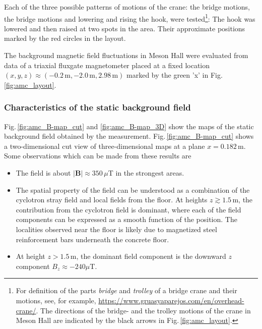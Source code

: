 Each of the three possible patterns of motions of the crane: the bridge motions,  the bridge motions and lowering and rising the hook, were tested\footnote{For definition of the parts \textit{bridge} and \textit{trolley} of a bridge crane and their motions, see, for example,  \url{https://www.gruasyaparejos.com/en/overhead-crane/}.  The directions of the bridge- and the trolley motions of the crane in Meson Hall are indicated by the black arrows in  Fig.\,\ref{fig:amc_layout}.}: 
The hook was lowered and then raised at two spots in the area. Their approximate positions marked by the red circles in the layout. 

The background magnetic field fluctuations in Meson Hall were evaluated from data of a triaxial fluxgate magnetometer placed at a fixed location $(x,y,z) \approx (-0.2\,\mathrm{m}, -2.0\,\mathrm{m}, 2.98\,\mathrm{m})$ marked by the green 'x' in Fig.\,\ref{fig:amc_layout}.




\subsubsection*{Characteristics of the static background field}
Fig.\,\ref{fig:amc_B-map_cut} and \ref{fig:amc_B-map_3D} show the  maps of the 
static background field obtained by the measurement. Fig.\,\ref{fig:amc_B-map_cut} shows a two-dimensional cut view of  three-dimensional maps at a plane $x=0.182\,\mathrm{m}$.  Some observations which can be made from these results are 
\begin{itemize}

\item The field is about $|\mathbf{B}|\approx 350\,\mu$T in the strongest areas.
\item The spatial property of the field can be understood as a combination of the cyclotron stray field and local fields from the floor. At heights $z \gtrsim 1.5\,\mathrm{m} $, the contribution from the cyclotron field is dominant,  where  each of the field components can be expressed as a smooth function of the position. The localities observed near the floor is likely due to magnetized steel reinforcement bars underneath the concrete floor.  
\item At height $z>1.5\,\mathrm{m}$, the dominant field component is the downward $z$ component  $B_{z}\approx -240\mu$T.

\end{itemize}

